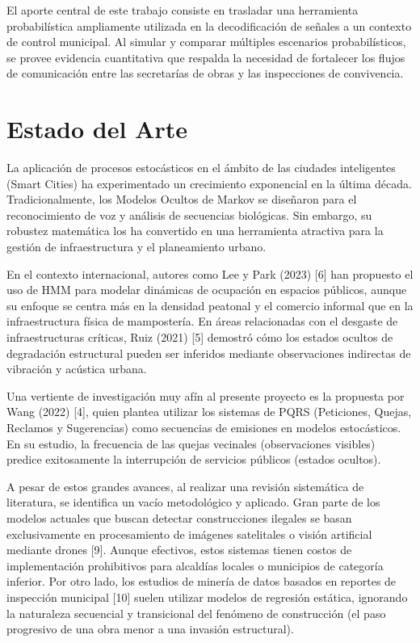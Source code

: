 \documentclass[12pt,letterpaper]{article}
\begin{document}
El aporte central de este trabajo consiste en trasladar una herramienta probabilística ampliamente utilizada en la decodificación de señales a un contexto de control municipal. Al simular y comparar múltiples escenarios probabilísticos, se provee evidencia cuantitativa que respalda la necesidad de fortalecer los flujos de comunicación entre las secretarías de obras y las inspecciones de convivencia.

\section{Estado del Arte}
La aplicación de procesos estocásticos en el ámbito de las ciudades inteligentes (Smart Cities) ha experimentado un crecimiento exponencial en la última década. Tradicionalmente, los Modelos Ocultos de Markov se diseñaron para el reconocimiento de voz y análisis de secuencias biológicas. Sin embargo, su robustez matemática los ha convertido en una herramienta atractiva para la gestión de infraestructura y el planeamiento urbano.

En el contexto internacional, autores como Lee y Park (2023) [6] han propuesto el uso de HMM para modelar dinámicas de ocupación en espacios públicos, aunque su enfoque se centra más en la densidad peatonal y el comercio informal que en la infraestructura física de mampostería. En áreas relacionadas con el desgaste de infraestructuras críticas, Ruiz (2021) [5] demostró cómo los estados ocultos de degradación estructural pueden ser inferidos mediante observaciones indirectas de vibración y acústica urbana. 

Una vertiente de investigación muy afín al presente proyecto es la propuesta por Wang (2022) [4], quien plantea utilizar los sistemas de PQRS (Peticiones, Quejas, Reclamos y Sugerencias) como secuencias de emisiones en modelos estocásticos. En su estudio, la frecuencia de las quejas vecinales (observaciones visibles) predice exitosamente la interrupción de servicios públicos (estados ocultos). 

A pesar de estos grandes avances, al realizar una revisión sistemática de literatura, se identifica un vacío metodológico y aplicado. Gran parte de los modelos actuales que buscan detectar construcciones ilegales se basan exclusivamente en procesamiento de imágenes satelitales o visión artificial mediante drones [9]. Aunque efectivos, estos sistemas tienen costos de implementación prohibitivos para alcaldías locales o municipios de categoría inferior. Por otro lado, los estudios de minería de datos basados en reportes de inspección municipal [10] suelen utilizar modelos de regresión estática, ignorando la naturaleza secuencial y transicional del fenómeno de construcción (el paso progresivo de una obra menor a una invasión estructural).
\end{document}
